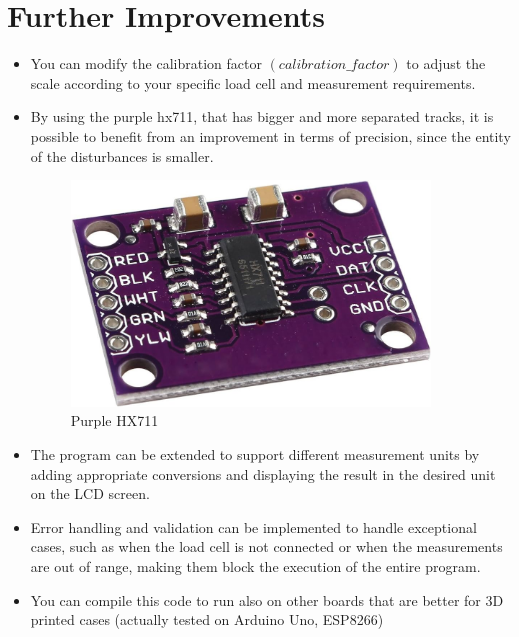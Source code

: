 \section{Further Improvements}


\begin{itemize}
    \item You can modify the calibration factor $(calibration\_factor)$ to adjust the scale according to your specific load cell and measurement requirements.
    \item By using the purple hx711, that has bigger and more separated tracks, it is possible to benefit from an improvement in terms of precision, since the entity of the disturbances is smaller.
    
    \begin{figure}[H]
    \centering
    \includegraphics[width=0.5\linewidth, height=6cm]{medias/parts/purple_hx711.jpg}
    \caption{Purple HX711}
    \label{fig:purplehx711}
    \end{figure}
    \noindent

    \item The program can be extended to support different measurement units by adding appropriate conversions and displaying the result in the desired unit on the LCD screen.
    \item Error handling and validation can be implemented to handle exceptional cases, such as when the load cell is not connected or when the measurements are out of range, making them block the execution of the entire program.
    \item You can compile this code to run also on other boards that are better for 3D printed cases (actually tested on Arduino Uno, ESP8266)
\end{itemize}


